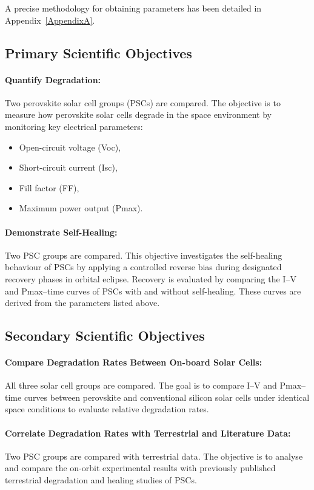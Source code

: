 A precise methodology for obtaining parameters has been detailed in Appendix~\ref{AppendixA}.

\subsection{Primary Scientific Objectives}

\paragraph{Quantify Degradation:}
Two perovskite solar cell groups (PSCs) are compared. The objective is to measure how perovskite solar cells degrade in the space environment by monitoring key electrical parameters:
\begin{itemize}
    \item Open-circuit voltage (Voc),
    \item Short-circuit current (Isc),
    \item Fill factor (FF),
    \item Maximum power output (Pmax).
\end{itemize}

\paragraph{Demonstrate Self-Healing:}
Two PSC groups are compared. This objective investigates the self-healing behaviour of PSCs by applying a controlled reverse bias during designated recovery phases in orbital eclipse. Recovery is evaluated by comparing the I--V and Pmax--time curves of PSCs with and without self-healing. These curves are derived from the parameters listed above.

\subsection{Secondary Scientific Objectives}

\paragraph{Compare Degradation Rates Between On-board Solar Cells:}
All three solar cell groups are compared. The goal is to compare I--V and Pmax--time curves between perovskite and conventional silicon solar cells under identical space conditions to evaluate relative degradation rates.

\paragraph{Correlate Degradation Rates with Terrestrial and Literature Data:}
Two PSC groups are compared with terrestrial data. The objective is to analyse and compare the on-orbit experimental results with previously published terrestrial degradation and healing studies of PSCs.
